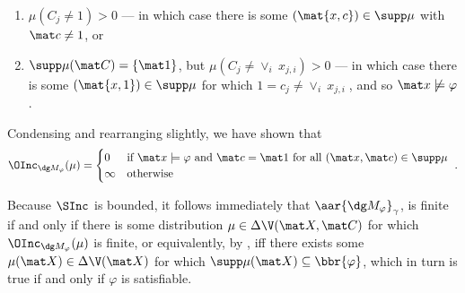\begin{lproof}
\begin{lproof}
\begin{enumerate}[itemsep=0pt]
			\begin{enumerate}
				\item $\mu(C_j \ne 1) > 0$ --- in which case there is some $(\mat{x,c}) \in \supp \mu$ with $\mat c \ne 1$, or
				\item $\supp \mu(\mat C) = \{\mat 1\}$, but $\mu(C_j \ne \vee_i~ x_{j,i}) > 0$ --- in which case there is some $(\mat{x,1}) \in \supp \mu$ for which $1 = c_j \ne \vee_i~x_{j,i}\;$, and so $\mat x \not\models \varphi$.
			\end{enumerate}
		\end{enumerate}
		Condensing and rearranging slightly, we have shown that
		\[
			\OInc_{\dg M_\varphi}(\mu) =
			\begin{cases}
				0 & \text{if}~  \mat x \models \varphi~\text{and}~\mat c = \mat 1
				 	~\text{for all}~(\mat x, \mat c) \in \supp \mu\\
				\infty & \text{otherwise}
			\end{cases}~.
		\]
	\end{lproof}

	Because $\SInc_{}$ is bounded, it follows immediately that
 	$\aar{\dg M_\varphi}_\gamma$, is finite if and only if
	there is some distribution $\mu \in \Delta\V(\mat X,\mat C)$ for which $\OInc_{\dg M_\varphi}(\mu)$ is finite, or equivalently, by , iff there exists some $\mu(\mat X) \in \Delta \V(\mat X)$ for which $\supp \mu(\mat X) \subseteq \bbr{\varphi}$, which in turn is true if and only if $\varphi$ is satisfiable.


\end{lproof}
